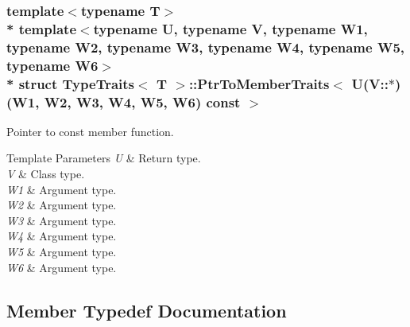 \subsubsection*{template$<$typename T$>$\\*
template$<$typename U, typename V, typename W1, typename W2, typename W3, typename W4, typename W5, typename W6$>$\\*
struct Type\+Traits$<$ T $>$\+::\+Ptr\+To\+Member\+Traits$<$ U(\+V\+::$\ast$)(\+W1, W2, W3, W4, W5, W6) const  $>$}

Pointer to const member function. 
\begin{DoxyTemplParams}{Template Parameters}
{\em U} & Return type. \\
\hline
{\em V} & Class type. \\
\hline
{\em W1} & Argument type. \\
\hline
{\em W2} & Argument type. \\
\hline
{\em W3} & Argument type. \\
\hline
{\em W4} & Argument type. \\
\hline
{\em W5} & Argument type. \\
\hline
{\em W6} & Argument type. \\
\hline
\end{DoxyTemplParams}


\subsection{Member Typedef Documentation}
